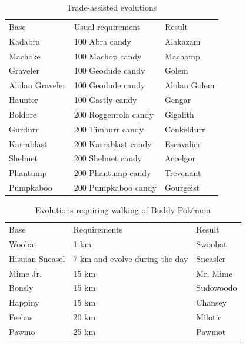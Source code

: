 \begin{table}
\footnotesize
\centering
\begin{tabular}{lll}
  Base & Usual requirement & Result \\
\Midrule
Kadabra & 100 Abra candy & Alakazam\\
Machoke & 100 Machop candy & Machamp\\
  Graveler & 100 Geodude candy & Golem\\
  Alolan Graveler & 100 Geodude candy & Alolan Golem\\
  Haunter & 100 Gastly candy & Gengar\\
  Boldore & 200 Roggenrola candy & Gigalith\\
  Gurdurr & 200 Timburr candy & Conkeldurr\\
  Karrablast & 200 Karrablast candy & Escavalier\\
  Shelmet & 200 Shelmet candy & Accelgor\\
  Phantump & 200 Phantump candy & Trevenant\\
  Pumpkaboo & 200 Pumpkaboo candy & Gourgeist\\
\end{tabular}
  \caption{Trade-assisted evolutions}
\label{table:tradeevolution}
\end{table}
\begin{table}
\footnotesize
\centering
\begin{tabular}{lll}
  Base & Requirements & Result \\
\Midrule
  Woobat & 1 km & Swoobat\\
  Hisuian Sneasel & 7 km and evolve during the day & Sneasler\\
  Mime Jr. & 15 km & Mr. Mime\\
  Bonsly & 15 km & Sudowoodo\\
  Happiny & 15 km & Chansey\\
  Feebas & 20 km & Milotic\\
  Pawmo & 25 km & Pawmot\\
\end{tabular}
  \caption{Evolutions requiring walking of Buddy Pokémon}
\label{table:walkevolutions}
\end{table}
